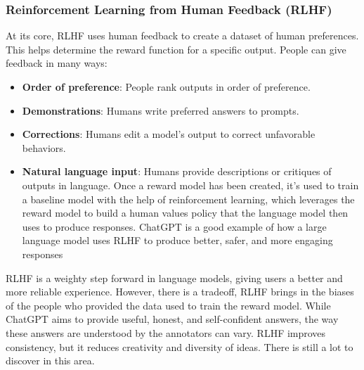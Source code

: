 \subsubsection{Reinforcement Learning from Human Feedback (RLHF)}
At its core, RLHF uses human feedback to create a dataset of human preferences. This helps determine the reward function for a specific output. People can give feedback in many ways:
\begin{itemize}
    \item \textbf{Order of preference}: People rank outputs in order of preference.
    \item \textbf{Demonstrations}: Humans write preferred answers to prompts.
    \item \textbf{Corrections}: Humans edit a model’s output to correct unfavorable behaviors.
    \item \textbf{Natural language input}: Humans provide descriptions or critiques of outputs in language. Once a reward model has been created, it’s used to train a baseline model with the help of reinforcement learning, which leverages the reward model to build a human values policy that the language model then uses to produce responses. ChatGPT is a good example of how a large language model uses RLHF to produce better, safer, and more engaging responses
    
\end{itemize}
RLHF is a weighty step forward in language models, giving users a better and more reliable experience. However, there is a tradeoff, RLHF brings in the biases of the people who provided the data used to train the reward model. While ChatGPT aims to provide useful, honest, and self-confident answers, the way these answers are understood by the annotators can vary. RLHF improves consistency, but it reduces creativity and diversity of ideas. There is still a lot to discover in this area.
